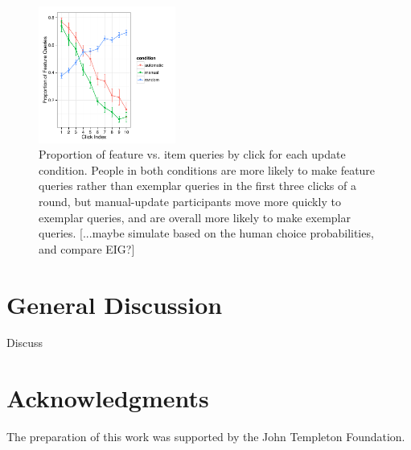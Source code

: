 \documentclass[10pt,letterpaper]{article}
\begin{document}
\begin{figure}[!h]
  \centering
  \includegraphics[width=0.4\textwidth]{figures/query_type_prop_by_click}
  \caption{Proportion of feature vs. item queries by click for each update condition. People in both conditions are more likely to make feature queries rather than exemplar queries in the first three clicks of a round, but manual-update participants move more quickly to exemplar queries, and are overall more likely to make exemplar queries.  [...maybe simulate based on the human choice probabilities, and compare EIG?]}
  \label{fig:query-prop-click}
\end{figure} 

\section{General Discussion}

Discuss

\section{Acknowledgments}

The preparation of this work was supported by the John Templeton Foundation.



\setlength{\bibleftmargin}{.125in}
\setlength{\bibindent}{-\bibleftmargin}


\end{document}
